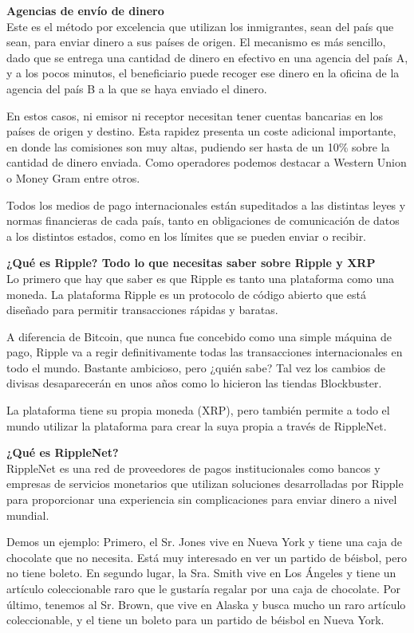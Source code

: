 \documentclass[a4paper,12pt]{/home/armando/Documentos/Cursos/LaTeX/Plantillas/lib/pub}
\begin{document}
	\textbf{Agencias de envío de dinero}\\
	
	Este es el método por excelencia que utilizan los inmigrantes, sean del país que sean, para enviar dinero a sus países de origen. El mecanismo es más sencillo, dado que se entrega una cantidad de dinero en efectivo en una agencia del país A, y a los pocos minutos, el beneficiario puede recoger ese dinero en la oficina de la agencia del país B a la que se haya enviado el dinero.
	
	En estos casos, ni emisor ni receptor necesitan tener cuentas bancarias en los países de origen y destino. Esta rapidez presenta un coste adicional importante, en donde las comisiones son muy altas, pudiendo ser hasta de un 10\% sobre la cantidad de dinero enviada. Como operadores podemos destacar a Western Union o Money Gram entre otros.
	
	Todos los medios de pago internacionales están supeditados a las distintas leyes y normas financieras de cada país, tanto en obligaciones de comunicación de datos a los distintos estados, como en los límites que se pueden enviar o recibir.
	
	\textbf{¿Qué es Ripple? Todo lo que necesitas saber sobre Ripple y XRP}\\ 
	
	Lo primero que hay que saber es que Ripple es tanto una plataforma como una moneda. La plataforma Ripple es un protocolo de código abierto que está diseñado para permitir transacciones rápidas y baratas.
	
	A diferencia de Bitcoin, que nunca fue concebido como una simple máquina de pago, Ripple va a regir definitivamente todas las transacciones internacionales en todo el mundo. Bastante ambicioso, pero ¿quién sabe? Tal vez los cambios de divisas desaparecerán en unos años como lo hicieron las tiendas Blockbuster.
	
	La plataforma tiene su propia moneda (XRP), pero también permite a todo el mundo utilizar la plataforma para crear la suya propia a través de RippleNet.
	
	\textbf{¿Qué es RippleNet?}\\
	
	RippleNet es una red de proveedores de pagos institucionales como bancos y empresas de servicios monetarios que utilizan soluciones desarrolladas por Ripple para proporcionar una experiencia sin complicaciones para enviar dinero a nivel mundial.
	
	Demos un ejemplo: Primero, el Sr. Jones vive en Nueva York y tiene una caja de chocolate que no necesita. Está muy interesado en ver un partido de béisbol, pero no tiene boleto. En segundo lugar, la Sra. Smith vive en Los Ángeles y tiene un artículo coleccionable raro que le gustaría regalar por una caja de chocolate. Por último, tenemos al Sr. Brown, que vive en Alaska y busca mucho un raro artículo coleccionable, y el tiene un boleto para un partido de béisbol en Nueva York.
	
\end{document}
